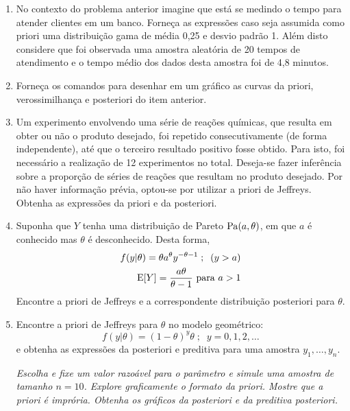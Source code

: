 \documentclass[11pt,a4]{article}\usepackage[]{graphicx}\usepackage[]{xcolor}
\begin{document}
\begin{enumerate}
\item No contexto do problema anterior imagine que está se medindo o tempo para atender clientes em um banco.
  Forneça as expressões caso seja assumida como priori uma distribuição gama de média 0,25 e desvio padrão 1.
  Além disto considere que foi observada uma amostra aleatória de 20 tempos de atendimento e o tempo médio dos dados
  desta amostra foi de 4,8 minutos.

\item Forneça os comandos para desenhar em um gráfico as curvas da priori, verossimilhança e posteriori do item anterior.



\item Um experimento envolvendo uma série de reações químicas, 
  que resulta em obter ou não o produto desejado, foi repetido 
  consecutivamente (de forma independente), até que 
  o terceiro resultado positivo fosse obtido. 
  Para isto, foi necessário a realização de 12 experimentos no total.
  Deseja-se fazer inferência sobre a proporção de séries de reações que 
  resultam no produto desejado. 
  Por não haver informação prévia, optou-se por utilizar a priori de Jeffreys.
  Obtenha as expressões da priori e da posteriori. 
  
\item Suponha que $Y$ tenha uma distribuição de Pareto ${\rm Pa}(a, \theta)$, em que $a$ é conhecido mas $\theta$ é desconhecido. Desta forma,
\begin{align*}
  f(y|\theta) = \theta a^{\theta} y^{-\theta-1} \; ; \;\; (y > a) \\ 
  {\rm E}[Y] = \frac{a\theta}{\theta-1} \mbox{ para } a > 1
\end{align*}
Encontre a priori de Jeffreys  %
e a correspondente distribuição posteriori para $\theta$.

\item Encontre a priori de Jeffreys para $\theta$ no modelo geométrico:
  \[ f(y|\theta) = (1-\theta)^{y} \theta \; ; \;\; y= 0, 1, 2, \ldots  \]
  e obtenha as expressões da posteriori e preditiva para uma amostra $y_1, \ldots, y_n$.

\begin{extra}
  {\it Escolha e fixe um valor razoável para o parâmetro e simule uma amostra de tamanho $n=10$.
    Explore graficamente o formato da priori. Mostre que a priori é imprória.
    Obtenha os gráficos da posteriori e da preditiva posteriori.}
\end{extra}


\end{enumerate}
\end{document}
